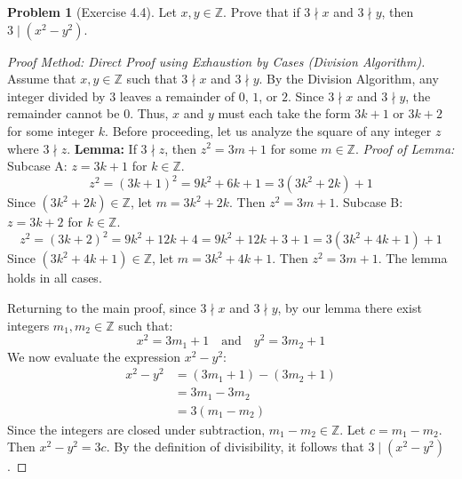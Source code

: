 \documentclass[11pt]{article}
\theoremstyle{definition}
\newtheorem{problem}{Problem}
\theoremstyle{remark}
\begin{document}
\vspace{1em}

\begin{problem}[Exercise 4.4]
Let $x, y \in \mathbb{Z}$. Prove that if $3 \nmid x$ and $3 \nmid y$, then $3 \mid (x^2 - y^2)$.
\end{problem}
\begin{proof}[Proof Method: Direct Proof using Exhaustion by Cases (Division Algorithm)]
Assume that $x, y \in \mathbb{Z}$ such that $3 \nmid x$ and $3 \nmid y$. 
By the Division Algorithm, any integer divided by $3$ leaves a remainder of $0$, $1$, or $2$. Since $3 \nmid x$ and $3 \nmid y$, the remainder cannot be $0$. Thus, $x$ and $y$ must each take the form $3k + 1$ or $3k + 2$ for some integer $k$. 
Before proceeding, let us analyze the square of any integer $z$ where $3 \nmid z$.
\textbf{Lemma:} If $3 \nmid z$, then $z^2 = 3m + 1$ for some $m \in \mathbb{Z}$.
\textit{Proof of Lemma:}
Subcase A: $z = 3k + 1$ for $k \in \mathbb{Z}$.
\[ z^2 = (3k + 1)^2 = 9k^2 + 6k + 1 = 3(3k^2 + 2k) + 1 \]
Since $(3k^2 + 2k) \in \mathbb{Z}$, let $m = 3k^2 + 2k$. Then $z^2 = 3m + 1$.
Subcase B: $z = 3k + 2$ for $k \in \mathbb{Z}$.
\[ z^2 = (3k + 2)^2 = 9k^2 + 12k + 4 = 9k^2 + 12k + 3 + 1 = 3(3k^2 + 4k + 1) + 1 \]
Since $(3k^2 + 4k + 1) \in \mathbb{Z}$, let $m = 3k^2 + 4k + 1$. Then $z^2 = 3m + 1$.
The lemma holds in all cases.

Returning to the main proof, since $3 \nmid x$ and $3 \nmid y$, by our lemma there exist integers $m_1, m_2 \in \mathbb{Z}$ such that:
\[ x^2 = 3m_1 + 1 \quad \text{and} \quad y^2 = 3m_2 + 1 \]
We now evaluate the expression $x^2 - y^2$:
\begin{align*}
x^2 - y^2 &= (3m_1 + 1) - (3m_2 + 1) \\
&= 3m_1 - 3m_2 \\
&= 3(m_1 - m_2)
\end{align*}
Since the integers are closed under subtraction, $m_1 - m_2 \in \mathbb{Z}$. Let $c = m_1 - m_2$. Then $x^2 - y^2 = 3c$. By the definition of divisibility, it follows that $3 \mid (x^2 - y^2)$.
\end{proof}

\vspace{1em}
\end{document}
